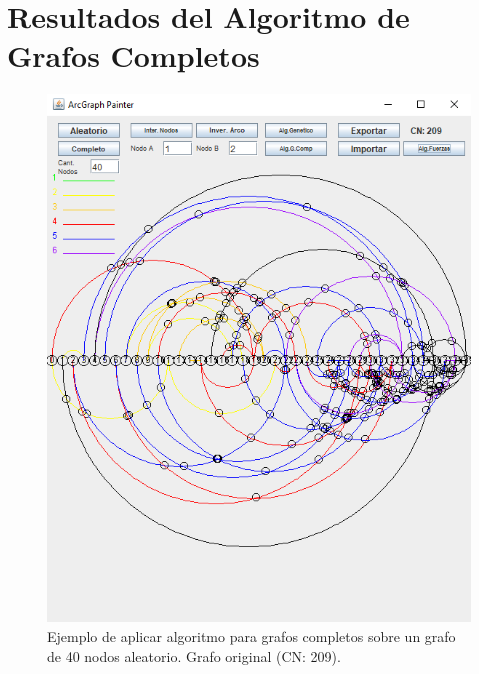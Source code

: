 \section{Resultados del Algoritmo de Grafos Completos}
\begin{figure}
	\centering
		\includegraphics[scale=0.7]{imagenes/grafo_example_ori.png}
		\caption{Ejemplo de aplicar algoritmo para grafos completos sobre un grafo de 40 nodos aleatorio. Grafo original (CN: 209).}
	\label{fig1:resultado_ejemplo_grafo_ori_lin}
\end{figure}


